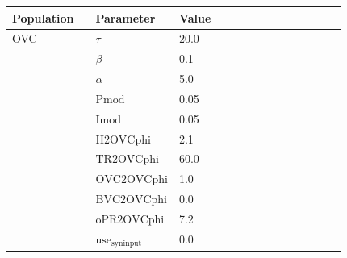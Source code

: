 \documentclass{article}
\begin{document}
\noindent
\begin{tabularx}{\linewidth}{|p{0.25\linewidth}|p{0.25\linewidth}|X|}\hline
\textbf{Population} & \textbf{Parameter} & \textbf{Value}   \\ \hline

    OVC             & $\tau$        & 20.0  \\ \hline

                 & $\beta$        & 0.1  \\ \hline

                 & $\alpha$        & 5.0  \\ \hline

                 & ${\text{Pmod}}$        & 0.05  \\ \hline

                 & ${\text{Imod}}$        & 0.05  \\ \hline

                 & ${\text{H2OVCphi}}$        & 2.1  \\ \hline

                 & ${\text{TR2OVCphi}}$        & 60.0  \\ \hline

                 & ${\text{OVC2OVCphi}}$        & 1.0  \\ \hline

                 & ${\text{BVC2OVCphi}}$        & 0.0  \\ \hline

                 & ${\text{oPR2OVCphi}}$        & 7.2  \\ \hline

                 & ${\text{use}}_{\text{syninput}}$        & 0.0  \\ \hline

\end{tabularx}

\vspace{2ex}
\end{document}

